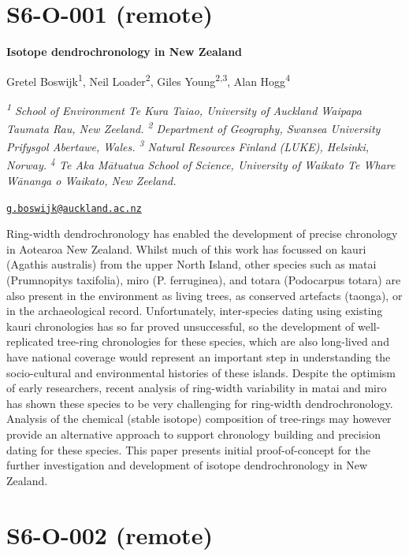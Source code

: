 \documentclass[
]{book}
\begin{document}
\hypertarget{s6-o-001-remote}{%
\section*{S6-O-001 (remote)}\label{s6-o-001-remote}}

\textbf{Isotope dendrochronology in New Zealand}

Gretel Boswijk\textsuperscript{1}, Neil Loader\textsuperscript{2}, Giles Young\textsuperscript{2,3}, Alan Hogg\textsuperscript{4}

\emph{\textsuperscript{1} School of Environment Te Kura Taiao, University of Auckland Waipapa Taumata Rau, New Zeeland. \textsuperscript{2} Department of Geography, Swansea University Prifysgol Abertawe, Wales. \textsuperscript{3} Natural Resources Finland (LUKE), Helsinki, Norway. \textsuperscript{4} Te Aka Mātuatua School of Science, University of Waikato Te Whare Wānanga o Waikato, New Zeeland.}

\href{mailto:g.boswijk@auckland.ac.nz}{\nolinkurl{g.boswijk@auckland.ac.nz}}

Ring-width dendrochronology has enabled the development of precise chronology in Aotearoa New Zealand. Whilst much of this work has focussed on kauri (Agathis australis) from the upper North Island, other species such as matai (Prumnopitys taxifolia), miro (P. ferruginea), and totara (Podocarpus totara) are also present in the environment as living trees, as conserved artefacts (taonga), or in the archaeological record. Unfortunately, inter-species dating using existing kauri chronologies has so far proved unsuccessful, so the development of well-replicated tree-ring chronologies for these species, which are also long-lived and have national coverage would represent an important step in understanding the socio-cultural and environmental histories of these islands. Despite the optimism of early researchers, recent analysis of ring-width variability in matai and miro has shown these species to be very challenging for ring-width dendrochronology. Analysis of the chemical (stable isotope) composition of tree-rings may however provide an alternative approach to support chronology building and precision dating for these species. This paper presents initial proof-of-concept for the further investigation and development of isotope dendrochronology in New Zealand.

\hypertarget{s6-o-002-remote}{%
\section*{S6-O-002 (remote)}\label{s6-o-002-remote}}
\end{document}
